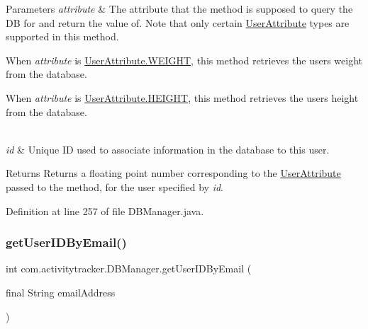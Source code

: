 \begin{DoxyParams}{Parameters}
{\em attribute} & The attribute that the method is supposed to query the DB for and return the value of. Note that only certain \mbox{\hyperlink{enumcom_1_1activitytracker_1_1_user_attribute}{User\+Attribute}} types are supported in this method.
\begin{DoxyItemize}
\item When {\itshape attribute} is \mbox{\hyperlink{enumcom_1_1activitytracker_1_1_user_attribute_a024206b0dc3261031ef586b3f0fd530c}{User\+Attribute.\+W\+E\+I\+G\+HT}}, this method retrieves the user\textquotesingle{}s weight from the database.
\item When {\itshape attribute} is \mbox{\hyperlink{enumcom_1_1activitytracker_1_1_user_attribute_a0a80ca5cce8eb4494c2128bd4291a5b7}{User\+Attribute.\+H\+E\+I\+G\+HT}}, this method retrieves the user\textquotesingle{}s height from the database. 
\end{DoxyItemize}\\
\hline
{\em id} & Unique ID used to associate information in the database to this user.\\
\hline
\end{DoxyParams}
\begin{DoxyReturn}{Returns}
Returns a floating point number corresponding to the \mbox{\hyperlink{enumcom_1_1activitytracker_1_1_user_attribute}{User\+Attribute}} passed to the method, for the user specified by {\itshape id}. 
\end{DoxyReturn}


Definition at line 257 of file D\+B\+Manager.\+java.

\mbox{\label{classcom_1_1activitytracker_1_1_d_b_manager_a195dcdeabdd00facb19d720976dd3f53}} 
\subsubsection{\texorpdfstring{get\+User\+I\+D\+By\+Email()}{getUserIDByEmail()}}
{\footnotesize\ttfamily int com.\+activitytracker.\+D\+B\+Manager.\+get\+User\+I\+D\+By\+Email (\begin{DoxyParamCaption}\item[{final String}]{email\+Address }\end{DoxyParamCaption})}

